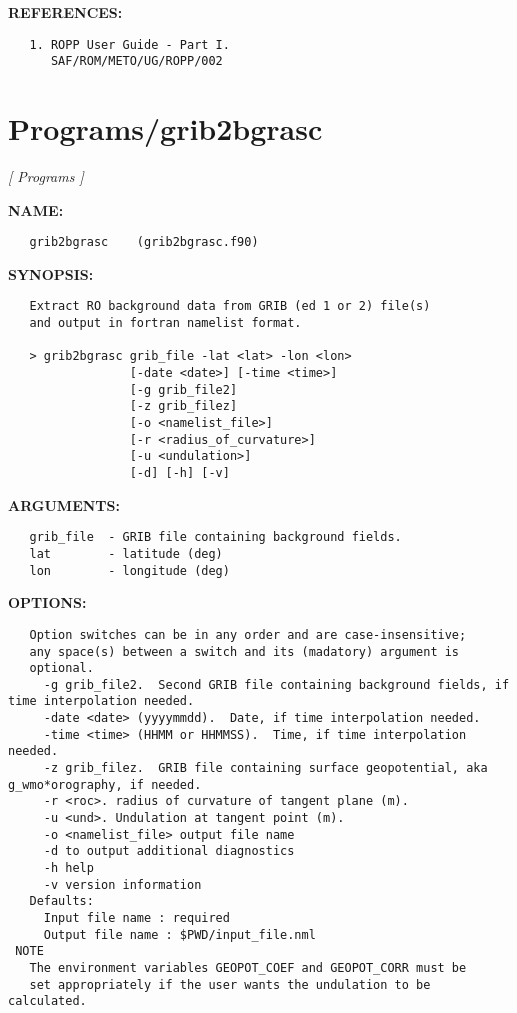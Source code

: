\textbf{REFERENCES:}\hspace{0.08in}\begin{Verbatim}
   1. ROPP User Guide - Part I.
      SAF/ROM/METO/UG/ROPP/002
\end{Verbatim}
\section{Programs/grib2bgrasc}
\textsl{[ Programs ]}

\label{ch:robo85}
\label{ch:Programs_grib2bgrasc}
\textbf{NAME:}\hspace{0.08in}\begin{Verbatim}
   grib2bgrasc    (grib2bgrasc.f90)
\end{Verbatim}
\textbf{SYNOPSIS:}\hspace{0.08in}\begin{Verbatim}
   Extract RO background data from GRIB (ed 1 or 2) file(s) 
   and output in fortran namelist format.

   > grib2bgrasc grib_file -lat <lat> -lon <lon>
                 [-date <date>] [-time <time>] 
                 [-g grib_file2]
                 [-z grib_filez]
                 [-o <namelist_file>]
                 [-r <radius_of_curvature>]
                 [-u <undulation>]
                 [-d] [-h] [-v]
\end{Verbatim}
\textbf{ARGUMENTS:}\hspace{0.08in}\begin{Verbatim}
   grib_file  - GRIB file containing background fields.
   lat        - latitude (deg)
   lon        - longitude (deg)
\end{Verbatim}
\textbf{OPTIONS:}\hspace{0.08in}\begin{Verbatim}
   Option switches can be in any order and are case-insensitive;
   any space(s) between a switch and its (madatory) argument is
   optional.
     -g grib_file2.  Second GRIB file containing background fields, if time interpolation needed.
     -date <date> (yyyymmdd).  Date, if time interpolation needed.
     -time <time> (HHMM or HHMMSS).  Time, if time interpolation needed.
     -z grib_filez.  GRIB file containing surface geopotential, aka g_wmo*orography, if needed.
     -r <roc>. radius of curvature of tangent plane (m).
     -u <und>. Undulation at tangent point (m).
     -o <namelist_file> output file name
     -d to output additional diagnostics
     -h help
     -v version information
   Defaults:
     Input file name : required
     Output file name : $PWD/input_file.nml
 NOTE
   The environment variables GEOPOT_COEF and GEOPOT_CORR must be
   set appropriately if the user wants the undulation to be calculated.
\end{Verbatim}
